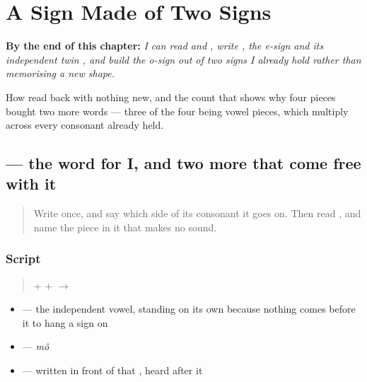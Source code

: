 
\chapter{A Sign Made of Two Signs}
\label{ch:bn-sign-made-of-two-signs}

\begin{chapteropening}
\textbf{By the end of this chapter:} \emph{I can read  and , write , the e-sign and its independent twin , and build the o-sign out of two signs I already hold rather than memorising a new shape.}

How read back with nothing new, and the count that shows why four pieces bought two more words — three of the four being vowel pieces, which multiply across every consonant already held.
\end{chapteropening}

\section[\texorpdfstring{\bn{আমি} (āmi)}{আমি (āmi)}]{ — the word for I, and two more that come free with it}

\label{lesson:BN-W02-ami-read}



\begin{quote}
Write \textbf{} once, and say which side of its consonant it goes on. Then read \textbf{}, and name the piece in it that makes no sound.
\end{quote}

\subsection*{Script}
\begin{quote}
\textbf{} + \textbf{} + \textbf{} $\to$ \textbf{}
\end{quote}

\begin{itemize}
\raggedright
  \item \textbf{} — the independent vowel, standing on its own because nothing comes before it to hang a sign on
  \item \textbf{} — \emph{mô}
  \item \textbf{} — written in front of that \textbf{}, heard after it
\end{itemize}

